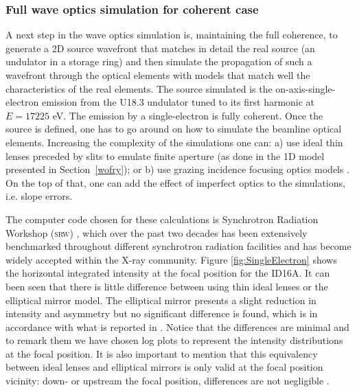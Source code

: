 \documentclass{iucr}              %
\begin{document}
\subsubsection{Full wave optics simulation for coherent case}
\label{srw_se}

A next step in the wave optics simulation is, maintaining the full coherence, to generate a 2D source wavefront that matches in detail the real source (an undulator in a storage ring) and then simulate the propagation of such a wavefront through the optical elements with models that match well the characteristics of the real elements. The source simulated is the on-axis-single-electron emission from the U18.3 undulator tuned to its first harmonic at $E=17225$ eV. The emission by a single-electron is fully coherent. Once the source is defined, one has to go around on how to simulate the beamline optical elements. Increasing the complexity of the simulations one can: a) use ideal thin lenses preceded by slits to emulate finite aperture (as done in the 1D model presented in Section~\ref{wofry}); or b) use grazing incidence focusing optics models \cite{Canestrari2014}. On the top of that, one can add the effect of imperfect optics to the simulations, i.e. slope errors. 

The computer code chosen for these calculations is Synchrotron Radiation Workshop (\textsc{srw}) \cite{codeSRW}, which over the past two decades has been extensively benchmarked throughout different synchrotron radiation facilities and has become widely accepted within the X-ray community. Figure \ref{fig:SingleElectron} shows the horizontal integrated intensity at the focal position for the ID16A. It can been seen that there is little difference between using thin ideal lenses or the elliptical mirror model. The elliptical mirror presents a slight reduction in intensity and asymmetry but no significant difference is found, which is in accordance with what is reported in \cite{Canestrari2014}. Notice that the differences are minimal and to remark them we have chosen log plots to represent the intensity distributions at the focal position. It is also important to mention that this equivalency between ideal lenses and elliptical mirrors is only valid at the focal position vicinity: down- or upstream the focal position, differences are not negligible \cite{Canestrari2014}. 
\end{document}
